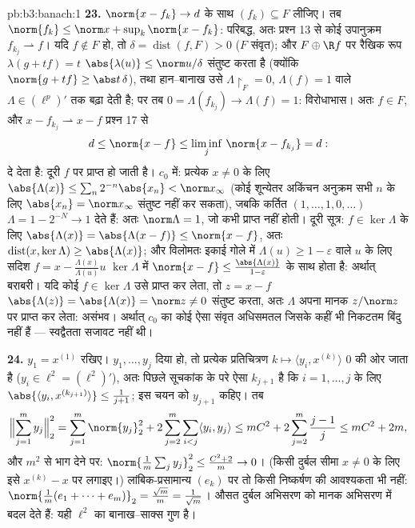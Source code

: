 \begin{solution}{pb:b3:banach:1}
\textbf{23.} $\norm{x - f_k}
\to d$ के साथ $(f_k) \subseteq F$ लीजिए। तब $\norm{f_k} \leq \norm x + \sup_k\norm{x -
f_k}$: परिबद्ध, अतः प्रश्न
13 से कोई उपानुक्रम $f_{k_j}
\rightharpoonup f$। यदि $f \notin F$ हो, तो $\delta =
\operatorname{dist}(f, F) > 0$ ($F$ संवृत);
और $F \oplus \R
f$ पर रैखिक रूप $\lambda(g + tf) = t$ $\abs{\lambda(u)} \leq \norm u/\delta$ संतुष्ट करता है (क्योंकि $\norm{g +
tf} \geq \abs t\,\delta$),
तथा हान--बानाख उसे $\Lambda\restriction_F = 0$, $\Lambda(f) = 1$ वाले $\Lambda \in (\ell^p)'$ तक बढ़ा देती है; पर तब
$0 = \Lambda(f_{k_j}) \to
\Lambda(f) = 1$: विरोधाभास। अतः $f \in F$, और $x -
f_{k_j} \rightharpoonup x - f$ प्रश्न 17 से
\[
d \leq \norm{x - f} \leq \liminf_j\,\norm{x - f_{k_j}} = d :
\]
दे देता है: दूरी $f$ पर प्राप्त हो जाती है। $c_0$ में: प्रत्येक
$x
\neq 0$ के लिए $\abs{\Lambda(x)}
\leq \sum_n2^{-n}\abs{x_n} < \norm x_\infty$ (कोई शून्येतर अकिंचन अनुक्रम सभी $n$ के लिए
$\abs{x_n} =
\norm x_\infty$ संतुष्ट नहीं कर सकता), जबकि कर्तित $(1,
\dots, 1, 0, \dots)$ $\Lambda = 1 - 2^{-N} \to 1$ देते हैं: अतः
$\norm\Lambda = 1$, जो कभी प्राप्त नहीं होती। दूरी सूत्र: $f
\in \ker\Lambda$ के लिए $\abs{\Lambda(x)} = \abs{\Lambda(x - f)}
\leq \norm{x - f}$, अतः
$\operatorname{dist}(x, \ker\Lambda)
\geq \abs{\Lambda(x)}$; और विलोमतः इकाई गोले में $\Lambda(u) \geq 1 - \varepsilon$ वाले $u$ के लिए सदिश $f = x -
\frac{\Lambda(x)}{\Lambda(u)}u$
$\ker\Lambda$ में $\norm{x - f} \leq \frac{\abs{\Lambda(x)}}{1 - \varepsilon}$ के साथ होता है: अर्थात् बराबरी। यदि कोई $f \in \ker\Lambda$ उसे
प्राप्त कर लेता, तो $z = x -
f$ $\abs{\Lambda(z)} = \abs{\Lambda(x)} =
\norm z \neq 0$ संतुष्ट करता, अतः $\Lambda$ अपना मानक
$z/\norm z$ पर प्राप्त कर लेता: असंभव। अर्थात् $c_0$ का कोई ऐसा संवृत
अधिसमतल जिसके कहीं भी निकटतम बिंदु नहीं हैं --- स्वद्वैतता सजावट
नहीं थी।

\textbf{24.} $y_1 = x^{(1)}$ रखिए। $y_1, \dots, y_j$ दिया हो, तो प्रत्येक प्रतिचित्रण
$k \mapsto \langle y_i, x^{(k)}\rangle$ $0$ की ओर जाता है ($y_i \in \ell^2 = (\ell^2)'$), अतः पिछले सूचकांक के परे ऐसा
$k_{j+1}$ है कि $i = 1, \dots,
j$ के लिए $\abs{\langle y_i,
x^{(k_{j+1})}\rangle} \leq \frac1{j+1}$; इस चयन को $y_{j+1}$ कहिए। तब
\[
\Bigl\lVert\sum_{j=1}^my_j\Bigr\rVert_2^2
= \sum_{j=1}^m\norm{y_j}_2^2
+ 2\sum_{j=2}^m\sum_{i<j}\langle y_i, y_j\rangle
\leq mC^2 + 2\sum_{j=2}^m\frac{j-1}j
\leq mC^2 + 2m,
\]
और $m^2$ से भाग देने पर: $\norm{\frac1m\sum_jy_j}_2^2 \leq
\frac{C^2 + 2}m \to 0$। (किसी दुर्बल सीमा $x \neq 0$ के लिए इसे
$x^{(k)} - x$ पर लगाइए।) लांबिक-प्रसामान्य $(e_k)$ पर तो किसी निष्कर्षण की
आवश्यकता भी नहीं: $\norm{\frac1m(e_1 + \dots +
e_m)}_2 = \frac{\sqrt m}m = \frac1{\sqrt m}$। औसत दुर्बल अभिसरण को मानक अभिसरण में बदल
देते हैं: यही $\ell^2$ का बानाख--साक्स गुण है।


\end{solution}
